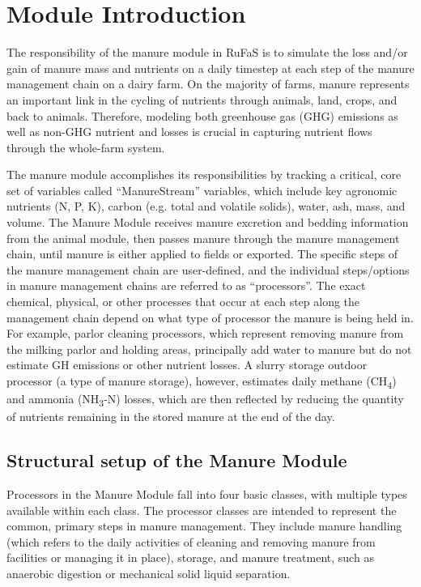 \section{Module Introduction}
\begin{refsection}
\par\noindent\justifying
The responsibility of the manure module in RuFaS is to simulate the loss and/or gain of manure mass and nutrients on a daily timestep at each step of the manure management chain on a dairy farm. On the majority of farms, manure represents an important link in the cycling of nutrients through animals, land, crops, and back to animals. Therefore, modeling both greenhouse gas (GHG) emissions as well as non-GHG nutrient and losses is crucial in capturing nutrient flows through the whole-farm system. 
    
The manure module accomplishes its responsibilities by tracking a critical, core set of variables called “ManureStream” variables, which include key agronomic nutrients (N, P, K), carbon (e.g. total and volatile solids), water, ash, mass, and volume. The Manure Module receives manure excretion and bedding information from the animal module, then passes manure through the manure management chain, until manure is either applied to fields or exported. The specific steps of the manure management chain are user-defined, and the individual steps/options in manure management chains are referred to as “processors”. The exact chemical, physical, or other processes that occur at each step along the management chain depend on what type of processor the manure is being held in. For example, parlor cleaning processors, which represent removing manure from the milking parlor and holding areas, principally add water to manure but do not estimate GH emissions or other nutrient losses. A slurry storage outdoor processor (a type of manure storage), however, estimates daily methane (CH\textsubscript{4}) and ammonia (NH\textsubscript{3}-N) losses, which are then reflected by reducing the quantity of nutrients remaining in the stored manure at the end of the day. 


\subsection{Structural setup of the Manure Module}
    Processors in the Manure Module fall into four basic classes, with multiple types available within each class. The processor classes are intended to represent the common, primary steps in manure management. They include manure handling (which refers to the daily activities of cleaning and removing manure from facilities or managing it in place), storage, and manure treatment, such as anaerobic digestion or mechanical solid liquid separation. 


\end{refsection}
